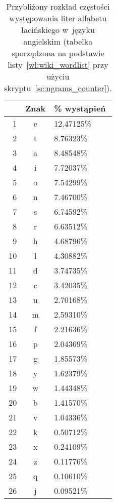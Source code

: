 \begin{table}[htb]
    \caption{Przybliżony rozkład częstości występowania liter alfabetu
    łacińskiego w~języku angielskim (tabelka sporządzona na podstawie
    listy~\ref{wl:wiki_wordlist} przy użyciu skryptu~\ref{sc:ngrams_counter}).}
    \begin{tabular}{|r||c|l|}
        \hline
        &Znak & \small \small \% wystąpień \\
        \hline
        1  & e & 12.47125\% \\
        2  & t &  8.76323\% \\
        3  & a &  8.48548\% \\
        4  & i &  7.72037\% \\
        5  & o &  7.54299\% \\
        6  & n &  7.46700\% \\
        7  & s &  6.74592\% \\
        8  & r &  6.63512\% \\
        9  & h &  4.68796\% \\
        10 & l &  4.30882\% \\
        11 & d &  3.74735\% \\
        12 & c &  3.42035\% \\
        13 & u &  2.70168\% \\
        14 & m & 2.59310\% \\
        15 & f & 2.21636\% \\
        16 & p & 2.04369\% \\
        17 & g & 1.85573\% \\
        18 & y & 1.62379\% \\
        19 & w & 1.44348\% \\
        20 & b & 1.41570\% \\
        21 & v & 1.04336\% \\
        22 & k & 0.50712\% \\
        23 & x & 0.24109\% \\
        24 & z & 0.11776\% \\
        25 & q & 0.10610\% \\
        26 & j & 0.09521\% \\
        \hline
    \end{tabular}
\end{table}

